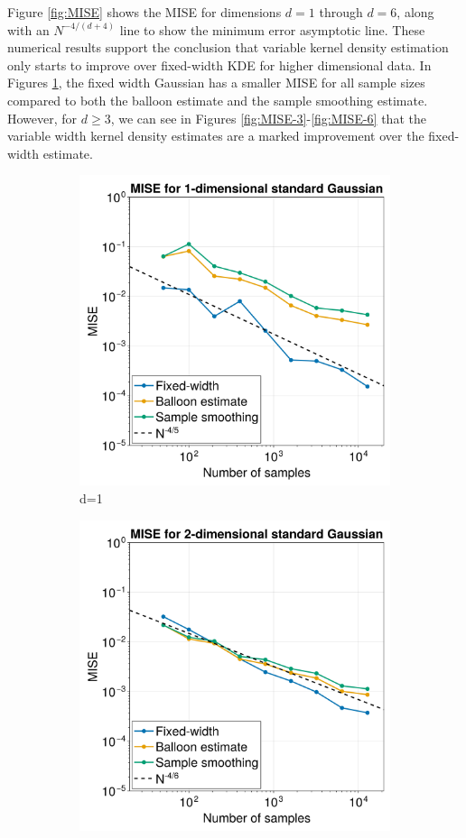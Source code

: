 \documentclass{article}
\begin{document}
Figure \ref{fig:MISE} shows the MISE for dimensions $d=1$ through $d=6$, along with an $N^{-4/(d+4)}$ line to show the minimum error asymptotic line. These numerical results support the conclusion that variable kernel density estimation only starts to improve over fixed-width KDE for higher dimensional data. In Figures \ref{fig:MISE-1}, the fixed width Gaussian has a smaller MISE for all sample sizes compared to both the balloon estimate and the sample smoothing estimate. However, for $d\geq3$, we can see in Figures \ref{fig:MISE-3}-\ref{fig:MISE-6} that the variable width kernel density estimates are a marked improvement over the fixed-width estimate.

\begin{figure}
\begin{subfigure}{.5\textwidth}
  \centering
  \includegraphics[width=0.7\linewidth]{images/MISE_d=1.png}
  \caption{d=1}
  \label{fig:MISE-1}
\end{subfigure}
\begin{subfigure}{.5\textwidth}
  \centering
  \includegraphics[width=0.7\linewidth]{images/MISE_d=2.png}

\end{subfigure}
\end{figure}
\end{document}
